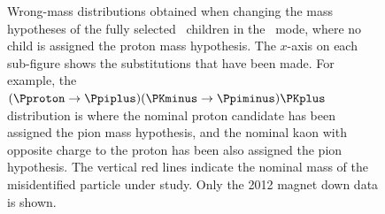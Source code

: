 \begin{figure}
  \caption{%
    Wrong-mass distributions obtained when changing the mass hypotheses of the
    fully selected \PLambdac\ children in the \pKK\ mode, where no child is
    assigned the proton mass hypothesis.
    The $x$-axis on each sub-figure shows the substitutions that have been
    made.
    For example, the ${(\Pproton \to \Ppiplus)(\PKminus \to \Ppiminus)\PKplus}$ distribution is
    where the nominal proton candidate has been assigned the pion mass
    hypothesis, and the nominal kaon with opposite charge to the proton has
    been also assigned the pion hypothesis.
    The vertical red lines indicate the nominal mass of the misidentified 
    particle under study.
    Only the 2012 magnet down data is shown.
  }
  \label{fig:cpv:selection:background_study:pKK_meson}
\end{figure}


